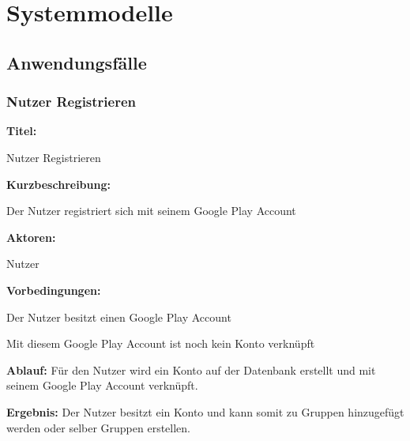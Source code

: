 \documentclass{scrartcl}
\begin{document}
	\newpage


	\section{Systemmodelle}
	
	\subsection{Anwendungsfälle}
	\subsubsection{Nutzer Registrieren}
	\begin{description}
		\item \textbf{Titel:}
		\begin{description}
			\item Nutzer Registrieren
		\end{description}
		\item \textbf{Kurzbeschreibung:}
		\begin{description}
			\item Der Nutzer registriert sich mit seinem Google Play Account
		\end{description}
		\item \textbf{Aktoren:}
		\begin{description}
			\item Nutzer 
		\end{description}
		\item \textbf{Vorbedingungen:}
		\begin{description}
			\item Der Nutzer besitzt einen Google Play Account
			\item Mit diesem Google Play Account ist noch kein Konto verknüpft
		\end{description}
		\item \textbf{Ablauf:} \newline Für den Nutzer wird ein Konto auf der Datenbank erstellt und mit seinem Google Play Account verknüpft.
		\item \textbf{Ergebnis:} \newline Der Nutzer besitzt ein Konto und kann somit zu Gruppen hinzugefügt werden oder selber Gruppen erstellen.
	\end{description}

	\newpage
	
\end{document}
